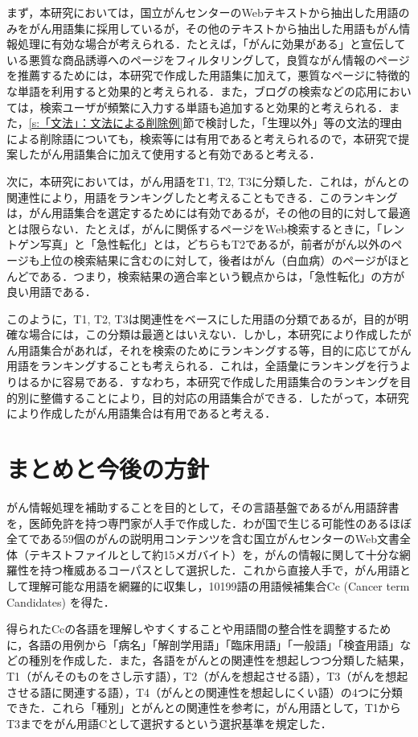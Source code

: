 \documentclass[japanese]{jnlp_1.4}
\begin{document}
まず，本研究においては，国立がんセンターのWebテキストから抽出した用語のみをがん用語集に採用しているが，その他のテキストから抽出した用語もがん情報処理に有効な場合が考えられる．たとえば，「がんに効果がある」と宣伝している悪質な商品誘導へのページをフィルタリングして，良質ながん情報のページを推薦するためには，本研究で作成した用語集に加えて，悪質なページに特徴的な単語を利用すると効果的と考えられる．また，ブログの検索などの応用においては，検索ユーザが頻繁に入力する単語も追加すると効果的と考えられる．また，\ref{s:「文法」：文法による削除例}節で検討した，「生理以外」等の文法的理由による削除語についても，検索等には有用であると考えられるので，本研究で提案したがん用語集合に加えて使用すると有効であると考える．

次に，本研究においては，がん用語をT1, T2, T3に分類した．これは，がんとの関連性により，用語をランキングしたと考えることもできる．このランキングは，がん用語集合を選定するためには有効であるが，その他の目的に対して最適とは限らない．たとえば，がんに関係するページをWeb検索するときに，「レントゲン写真」と「急性転化」とは，どちらもT2であるが，前者ががん以外のページも上位の検索結果に含むのに対して，後者はがん（白血病）のページがほとんどである．つまり，検索結果の適合率という観点からは，「急性転化」の方が良い用語である．

このように，T1, T2, T3は関連性をベースにした用語の分類であるが，目的が明確な場合には，この分類は最適とはいえない．しかし，本研究により作成したがん用語集合があれば，それを検索のためにランキングする等，目的に応じてがん用語をランキングすることも考えられる．これは，全語彙にランキングを行うよりはるかに容易である．すなわち，本研究で作成した用語集合のランキングを目的別に整備することにより，目的対応の用語集合ができる．したがって，本研究により作成したがん用語集合は有用であると考える．


\section{まとめと今後の方針}
\label{s:まとめと今後の方針}

がん情報処理を補助することを目的として，その言語基盤であるがん用語辞書を，医師免許を持つ専門家が人手で作成した．わが国で生じる可能性のあるほぼ全てである59個のがんの説明用コンテンツを含む国立がんセンターのWeb文書全体（テキストファイルとして約15メガバイト）を，がんの情報に関して十分な網羅性を持つ権威あるコーパスとして選択した．これから直接人手で，がん用語として理解可能な用語を網羅的に収集し，10199語の用語候補集合Cc (Cancer term Candidates) を得た．

得られたCcの各語を理解しやすくすることや用語間の整合性を調整するために，各語の用例から「病名」「解剖学用語」「臨床用語」「一般語」「検査用語」などの種別を作成した．また，各語をがんとの関連性を想起しつつ分類した結果，T1（がんそのものをさし示す語），T2（がんを想起させる語），T3（がんを想起させる語に関連する語），T4（がんとの関連性を想起しにくい語）の4つに分類できた．これら「種別」とがんとの関連性を参考に，がん用語として，T1からT3までをがん用語Cとして選択するという選択基準を規定した．
\end{document}
